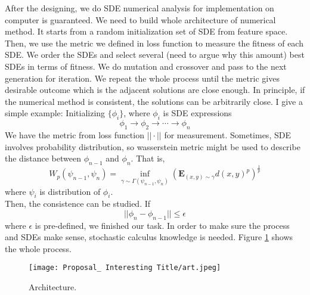 \documentclass[12pt]{article}
\begin{document}
After the designing, we do SDE numerical analysis for implementation on computer is guaranteed. We need to build whole architecture of numerical method. It starts from a random initialization set of SDE from feature space. Then, we use the metric we defined in loss function to measure the fitness of each SDE. We order the SDEs and select several (need to argue why this amount) best SDEs in terms of fitness. We do mutation and crossover and pass to the next generation for iteration. We repeat the whole process until the metric gives desirable outcome which is the adjacent solutions are close enough. In principle, if the numerical method is consistent, the solutions can be arbitrarily close. I give a simple example:
Initializing $\{\phi_i\}$, where $\phi_i$ is SDE expressions
\[
\phi_1 \to \phi_2 \to \cdots \to \phi_n
\]
We have the metric from loss function $||\cdot||$ for measurement. Sometimes, SDE involves probability distribution, so wasserstein metric might be used to describe the distance between $\phi_{n-1}$ and $\phi_n$. That is, 
\[
W_p(\psi_{n-1},\psi_{n})=\inf_{\gamma \sim \Gamma(\psi_{n-1},\psi_n)}(\mathbf{E}_{(x,y)\sim \gamma} d(x,y)^p)^{\frac{1}{p}}
\]
where $\psi_i$ is distribution of $\phi_i$. \\
Then, the consistence can be studied. If \[
||\phi_{n}-\phi_{n-1}||\leq \epsilon
\]
where $\epsilon$ is pre-defined, we finished our task. In order to make sure the process and SDEs make sense, stochastic calculus knowledge is needed. Figure \ref{fig:art} shows the whole process. 

\begin{figure}
    \centering
    \texttt{[image: Proposal\_ Interesting Title/art.jpeg]}
    \caption{Architecture.}
    \label{fig:art}
\end{figure}
\end{document}
